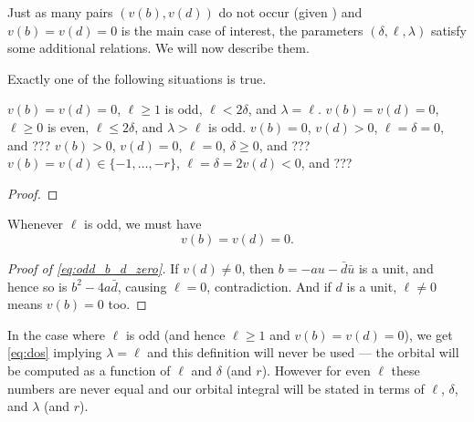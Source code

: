 Just as many pairs $(v(b), v(d))$ do not occur (given )
and $v(b) = v(d) = 0$ is the main case of interest,
the parameters $(\delta, \ell, \lambda)$ satisfy some additional relations.
We will now describe them.
\begin{proposition}
  Exactly one of the following situations is true.
  \begin{enumerate}[a.]
    \ii $v(b) = v(d) = 0$, $\ell \ge 1$ is odd,
      $\ell < 2 \delta$, and $\lambda = \ell$.
    \ii $v(b) = v(d) = 0$, $\ell \ge 0$ is even,
      $\ell \le 2 \delta$, and $\lambda > \ell$ is odd.
    \ii $v(b) = 0$, $v(d) > 0$, $\ell = \delta = 0$, and ???
    \ii $v(b) > 0$, $v(d) = 0$, $\ell  = 0$, $\delta \ge 0$, and ???
    \ii $v(b) = v(d) \in \{-1, \dots, -r\}$,
    $\ell = \delta = 2v(d) < 0$, and ???
  \end{enumerate}
  \label{prop:parameter_constraints}
\end{proposition}
\begin{proof}
\end{proof}

\begin{proposition}
  Whenever $\ell$ is odd, we must have
  \begin{equation}
    v(b) = v(d) = 0.
    \label{eq:odd_b_d_zero}
  \end{equation}
\end{proposition}
\begin{proof}
  [Proof of \eqref{eq:odd_b_d_zero}]
  If $v(d) \neq 0$, then $b = -au-\bar d\bar u$ is a unit,
  and hence so is $b^2 - 4 a \bar d$, causing $\ell = 0$, contradiction.
  And if $d$ is a unit, $\ell \neq 0$ means $v(b) = 0$ too.
\end{proof}

In the case where $\ell$ is odd (and hence $\ell \ge 1$ and $v(b) = v(d) = 0$),
we get \eqref{eq:dos} implying $\lambda = \ell$
and this definition will never be used --- the orbital will be computed
as a function of $\ell$ and $\delta$ (and $r$).
However for even $\ell$ these numbers are never equal and our orbital
integral will be stated in terms of $\ell$, $\delta$, and $\lambda$ (and $r$).

